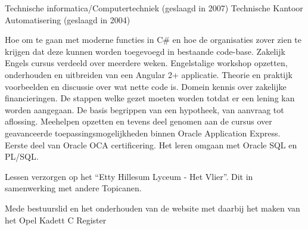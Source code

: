 \documentclass[
	a4paper,
	nameandjobposition=before,
	profilepicstyle=profilecircle
]{babelviscv}
\begin{document}
\newpage
\makebacksidebar

	\begin{cvtable}[1.5]
			{Technische informatica/Computertechniek
			\newline(geslaagd in 2007)}
			{Technische Kantoor Automatisering
			\newline(geslaagd in 2004)}
	\end{cvtable}

	\begin{cvtable}[1.5]
			{Hoe om te gaan met moderne functies in C\# en hoe de organisaties zover zien te krijgen dat deze kunnen worden toegevoegd in bestaande code-base.}
			{Zakelijk Engels cursus verdeeld over meerdere weken.}
			{Engelstalige workshop opzetten, onderhouden en uitbreiden van een Angular 2+ applicatie.}
			{Theorie en praktijk voorbeelden en discussie over wat nette code is.}
			{Domein kennis over zakelijke financieringen. De stappen welke gezet moeten worden totdat er een lening kan worden aangegaan.}
			{De basis begrippen van een hypotheek, van aanvraag tot aflossing.}
			{Meehelpen opzetten en tevens deel genomen aan de cursus over geavanceerde toepassingsmogelijkheden binnen Oracle Application Express.}
			{Eerste deel van Oracle OCA certificering.}
			{Het leren omgaan met Oracle SQL en PL/SQL.}
		\end{cvtable}

		\begin{cvtable}[1.5]
				{Lessen verzorgen op het “Etty Hillesum Lyceum - Het Vlier”. Dit in samenwerking met andere Topicanen.}
		\end{cvtable}

		\begin{cvtable}[1.5]
				{Mede bestuurslid en het onderhouden van de website met daarbij het maken van het Opel Kadett C Register}
		\end{cvtable}

\cvsignature
\end{document}
